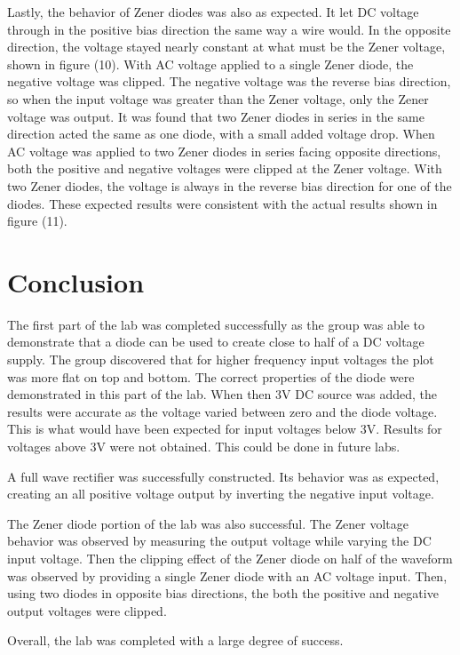 \documentclass[twocolumn, amsmath]{revtex4}
\begin{document}
Lastly, the behavior of Zener diodes was also as expected. It let DC voltage through in the positive bias direction the same way a wire would. In the opposite direction, the voltage stayed nearly constant at what must be the Zener voltage, shown in figure (10). With AC voltage applied to a single Zener diode, the negative voltage was clipped. The negative voltage was the reverse bias direction, so when the input voltage was greater than the Zener voltage, only the Zener voltage was output. It was found that two Zener diodes in series in the same direction acted the same as one diode, with a small added voltage drop. When AC voltage was applied to two Zener diodes in series facing opposite directions, both the positive and negative voltages were clipped at the Zener voltage. With two Zener diodes, the voltage is always in the reverse bias direction for one of the diodes. These expected results were consistent with the actual results shown in figure (11).

\section{Conclusion}
The first part of the lab was completed successfully as the group was able to demonstrate that a diode can be used to create close to half of a DC voltage supply. The group discovered that for higher frequency input voltages the plot was more flat on top and bottom. The correct properties of the diode were demonstrated in this part of the lab. When then 3V DC source was added, the results were accurate as the voltage varied between zero and the diode voltage. This is what would have been expected for input voltages below 3V. Results for voltages above 3V were not obtained. This could be done in future labs.

A full wave rectifier was successfully constructed. Its behavior was as expected, creating an all positive voltage output by inverting the negative input voltage. 

The Zener diode portion of the lab was also successful. The Zener voltage behavior was observed by measuring the output voltage while varying the DC input voltage. Then the clipping effect of the Zener diode on half of the waveform was observed by providing a single Zener diode with an AC voltage input. Then, using two diodes in opposite bias directions, the both the positive and negative output voltages were clipped.

Overall, the lab was completed with a large degree of success.
\end{document}
